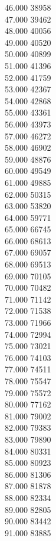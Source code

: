 { 46.000	38958 \\
 47.000	39462 \\
 48.000	40056 \\
 49.000	40520 \\
 50.000	40899 \\
 51.000	41396 \\
 52.000	41759 \\
 53.000	42367 \\
 54.000	42868 \\
 55.000	43361 \\
 56.000	43973 \\
 57.000	46272 \\
 58.000	46902 \\
 59.000	48876 \\
 60.000	49549 \\
 61.000	49885 \\
 62.000	50315 \\
 63.000	53820 \\
 64.000	59771 \\
 65.000	66745 \\
 66.000	68613 \\
 67.000	69057 \\
 68.000	69513 \\
 69.000	70105 \\
 70.000	70482 \\
 71.000	71142 \\
 72.000	71538 \\
 73.000	71966 \\
 74.000	72994 \\
 75.000	73021 \\
 76.000	74103 \\
 77.000	74511 \\
 78.000	75547 \\
 79.000	75572 \\
 80.000	77162 \\
 81.000	79002 \\
 82.000	79383 \\
 83.000	79890 \\
 84.000	80331 \\
 85.000	80923 \\
 86.000	81306 \\
 87.000	81878 \\
 88.000	82334 \\
 89.000	82805 \\
 90.000	83442 \\
 91.000	83885 \\
}
